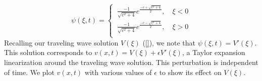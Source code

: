 \documentclass[12pt]{article}
\begin{document}
\begin{equation}\label{solnlambda0}
\psi(\xi,t)=
\begin{cases}
\ \frac{-1}{\sqrt{c^2+4}}e^{\frac{-c+\sqrt{c^2+4}}{2}},\quad \xi < 0 \\
\ \frac{-1}{\sqrt{c^2+4}}e^{\frac{-c-\sqrt{c^2+4}}{2}},\quad \xi > 0\\
\end{cases}
\end{equation}
Recalling our traveling wave solution $V(\xi)$ (\ref{}), we note that $\psi(\xi,t) = V'(\xi)$. This solution corresponds to $v(x,t) = V(\xi) + \epsilon V'(\xi)$, a Taylor expansion linearization around the traveling wave solution. This perturbation is independent of time. We plot $v(x,t)$ with various values of $\epsilon$ to show its effect on $V(\xi)$.
\end{document}
